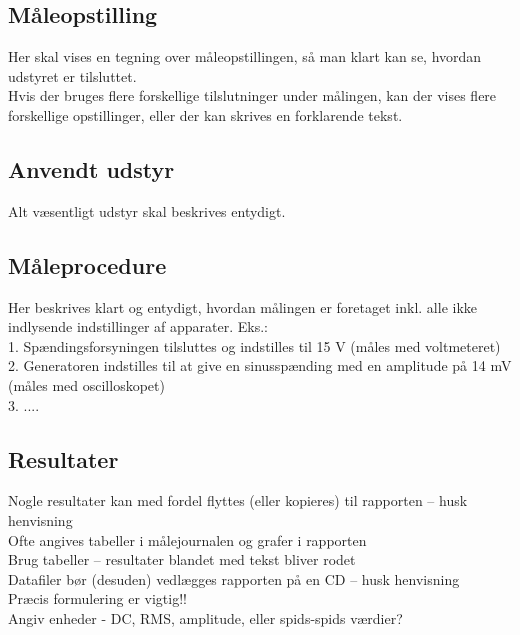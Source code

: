 \subsection*{Måleopstilling}
\label{maalejournal_maaleopstilling}
Her skal vises en tegning over måleopstillingen, så man klart kan se, hvordan udstyret er tilsluttet.\\
Hvis der bruges flere forskellige tilslutninger under målingen, kan der vises flere forskellige opstillinger, eller der kan skrives en forklarende tekst.\\

\subsection*{Anvendt udstyr}
\label{maalejournal_anvendtudstyr}
Alt væsentligt udstyr skal beskrives entydigt.\\

\subsection*{Måleprocedure}
\label{maalejournal_maaleprocedure}
Her beskrives klart og entydigt, hvordan målingen er foretaget inkl. alle ikke indlysende indstillinger af apparater. Eks.: \\
1. Spændingsforsyningen tilsluttes og indstilles til 15 V (måles med voltmeteret) \\
2. Generatoren indstilles til at give en sinusspænding med en amplitude på 14 mV (måles med oscilloskopet) \\
3. ....\\

\subsection*{Resultater}
\label{maalejournal_resultater}
Nogle resultater kan med fordel flyttes (eller kopieres) til rapporten – husk henvisning \\
Ofte angives tabeller i målejournalen og grafer i rapporten \\
Brug tabeller – resultater blandet med tekst bliver rodet\\
Datafiler bør (desuden) vedlægges rapporten på en CD – husk henvisning\\
Præcis formulering er vigtig!!\\
Angiv enheder - DC, RMS, amplitude, eller spids-spids værdier?\\


